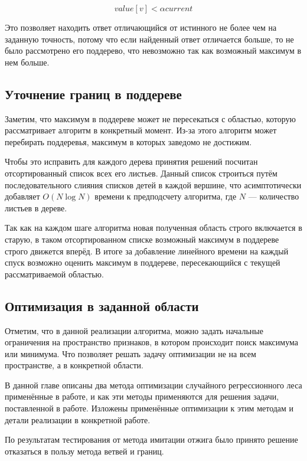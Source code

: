 \[
    value[v] < \alpha current
\]

Это позволяет находить ответ отличающийся от истинного не более чем на заданную
точность, потому что если найденный ответ отличается больше, то не было
рассмотрено его поддерево, что невозможно так как возможный максимум в нем
больше.

\subsection{Уточнение границ в поддереве}

Заметим, что максимум в поддереве может не пересекаться с областью, которую
рассматривает алгоритм в конкретный момент. Из-за этого алгоритм может
перебирать поддеревья, максимум в которых заведомо не достижим.

Чтобы это исправить для каждого дерева принятия решений посчитан отсортированный
список всех его листьев. Данный список строиться путём последовательного слияния
списков детей в каждой вершине, что асимптотически добавляет $O(N \log{N})$
времени к предподсчету алгоритма, где $N$ --- количество листьев в дереве.

Так как на каждом шаге алгоритма новая полученная область строго включается
в старую, в таком отсортированном списке возможный максимум в поддереве строго
движется вперёд. В итоге за добавление линейного времени на каждый спуск
возможно оценить максимум в поддереве, пересекающийся с текущей рассматриваемой
областью.

\subsection{Оптимизация в заданной области}

Отметим, что в данной реализации алгоритма, можно задать начальные ограничения
на пространство признаков, в котором происходит поиск максимума или минимума.
Что позволяет решать задачу оптимизации не на всем пространстве, а в конкретной
области.

\chapterconclusion

В данной главе описаны два метода оптимизации случайного регрессионного леса
применённые в работе, и как эти методы применяются для решения задачи,
поставленной в работе. Изложены применённые оптимизации к этим методам и детали
реализации в конкретной работе.

По результатам тестирования от метода имитации отжига было принято решение
отказаться в пользу метода ветвей и границ.
